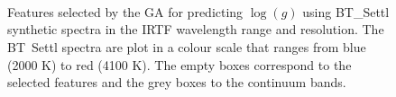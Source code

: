 %

\begin{figure}
 \captionsetup[subfloat]{farskip=2pt,captionskip=-18pt}
 \vspace*{-10pt}
 \\[-9ex]

 \\[-9ex]

 \\[-7ex]

 \caption{Features selected by the GA for predicting $\log(g)$ using
    BT\_Settl synthetic spectra in the IRTF wavelength range
    and resolution. The BT\ Settl spectra are plot in a colour scale
    that ranges from blue (2000 K) to red (4100 K). The empty boxes
    correspond to the selected features and the grey boxes to the
    continuum bands.}
 \label{fig:IRTF-logg} 
\end {figure}

